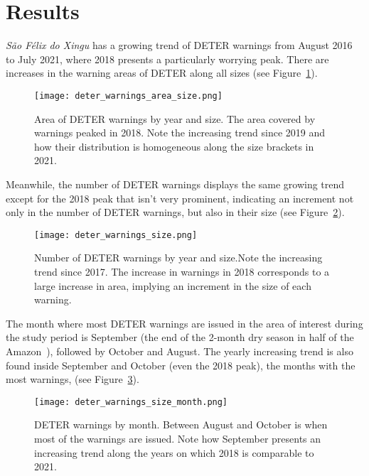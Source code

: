 \section{Results}

\textit{São Félix do Xingu} has a growing trend of DETER warnings from August 
2016 to July 2021, where 2018 presents a particularly worrying peak. There are increases
in the warning areas of DETER along all sizes (see 
Figure~\ref{fig:deter_warnings_area_size}).

\begin{figure}[h] 
    \begin{center}
    \texttt{[image: deter\_warnings\_area\_size.png]}
    \caption{Area of DETER warnings by year and size. The area covered by 
        warnings peaked in 2018. Note the increasing trend since 2019
        and how their distribution is homogeneous along the size brackets in 
        2021.}
    \label{fig:deter_warnings_area_size}
    \end{center}
\end{figure}

Meanwhile, the number of DETER warnings displays the same growing trend except
for the 2018 peak that isn't very prominent, indicating an increment not only 
in the number of DETER warnings, but also in their size (see 
Figure~\ref{fig:deter_warnings_size}).

\begin{figure}[h] 
    \begin{center}
    \texttt{[image: deter\_warnings\_size.png]}
    \caption{Number of DETER warnings by year and size.Note the increasing 
        trend since 2017. The increase in warnings in 2018 corresponds to a
        large increase in area, implying an increment in the size of each 
        warning.}
    \label{fig:deter_warnings_size}
    \end{center}
\end{figure}

The month where most DETER warnings are issued in the area of interest during
the study period is September (the end of the 2-month dry season in half of the
Amazon~\cite{carvalho2021}), followed by October and August.
The yearly increasing trend is also found inside September and October (even 
the 2018 peak), the months with the most warnings, (see 
Figure~\ref{fig:deter_warnings_size_month}). 

\begin{figure}[h] 
    \begin{center}
    \texttt{[image: deter\_warnings\_size\_month.png]}
    \caption{DETER warnings by month. Between August and October is when most
        of the warnings are issued. Note how September presents an increasing 
        trend along the years on which 2018 is comparable to 2021.}
    \label{fig:deter_warnings_size_month}
    \end{center}
\end{figure}

